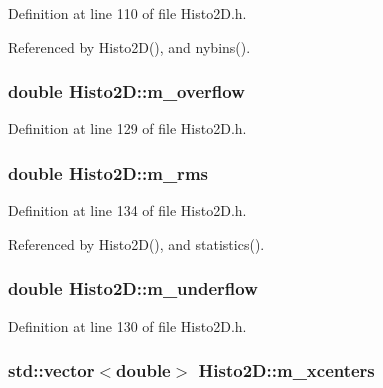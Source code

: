 Definition at line 110 of file Histo2D.h.

Referenced by Histo2D(), and nybins().\hypertarget{classHisto2D_a7ab17bc811ce4a5b45ab3779cc8e221a}{
\subsubsection[{m\_\-overflow}]{\setlength{\rightskip}{0pt plus 5cm}double {\bf Histo2D::m\_\-overflow}}}
\label{classHisto2D_a7ab17bc811ce4a5b45ab3779cc8e221a}


Definition at line 129 of file Histo2D.h.\hypertarget{classHisto2D_a461938b95bb93a810ae7941a181023cc}{
\subsubsection[{m\_\-rms}]{\setlength{\rightskip}{0pt plus 5cm}double {\bf Histo2D::m\_\-rms}}}
\label{classHisto2D_a461938b95bb93a810ae7941a181023cc}


Definition at line 134 of file Histo2D.h.

Referenced by Histo2D(), and statistics().\hypertarget{classHisto2D_ab21996b2788e5d0e78bb611df3584440}{
\subsubsection[{m\_\-underflow}]{\setlength{\rightskip}{0pt plus 5cm}double {\bf Histo2D::m\_\-underflow}}}
\label{classHisto2D_ab21996b2788e5d0e78bb611df3584440}


Definition at line 130 of file Histo2D.h.\hypertarget{classHisto2D_aa2e8211f89d086e1c0beaf3b7d18c568}{
\subsubsection[{m\_\-xcenters}]{\setlength{\rightskip}{0pt plus 5cm}std::vector$<$double$>$ {\bf Histo2D::m\_\-xcenters}}}
\label{classHisto2D_aa2e8211f89d086e1c0beaf3b7d18c568}


